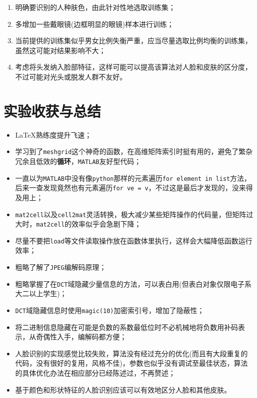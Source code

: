 \documentclass{article}
\numberwithin{figure}{section}
\numberwithin{table}{section}
\numberwithin{listing}{section}
\numberwithin{equation}{section}
\begin{document}
\begin{enumerate}
                \begin{enumerate}
                    \item 明确要识别的人种肤色，由此针对性地选取训练集；
                    \item 多增加一些戴眼镜(边框明显的眼镜)样本进行训练；
                    \item 当前提供的训练集似乎男女比例失衡严重，应当尽量选取比例均衡的训练集，虽然这可能对结果影响不大；
                    \item 考虑将头发纳入脸部特征，这样可能可以提高该算法对人脸和皮肤的区分度，不过可能对光头或脱发人群不友好。
                \end{enumerate}

        \end{enumerate}
    

    \newpage
    \section{实验收获与总结} %
    \label{sec:实验收获与总结}
    
        \begin{itemize}
            \item \LaTeX{}熟练度提升飞速；
            \item 学习到了\texttt{meshgrid}这个神奇的函数，在高维矩阵索引时挺有用的，避免了繁杂冗余且低效的\textbf{循环}，\texttt{MATLAB}友好型代码；
            \item 一直以为\texttt{MATLAB}中没有像\texttt{python}那样的元素遍历\texttt{for element in list}方法，后来一查发现竟然也有元素遍历\texttt{for ve = v}，不过这是最后才发现的，没来得及用上；
            \item \texttt{mat2cell}以及\texttt{cell2mat}灵活转换，极大减少某些矩阵操作的代码量，但矩阵过大时，\texttt{mat2cell}的效率似乎会急剧下降；
            \item 尽量不要把\texttt{load}等文件读取操作放在函数体里执行，这样会大幅降低函数运行效率；
            \item 粗略了解了\texttt{JPEG}编解码原理；
            \item 粗略掌握了在\texttt{DCT}域隐藏少量信息的方法，可以表白用(但表白对象仅限电子系大二以上学生)；
            \item \texttt{DCT}域隐藏信息时使用\texttt{magic(10)}加密索引号，增加了隐蔽性；
            \item 将二进制信息隐藏在可能是负数的系数最低位时不必机械地将负数用补码表示，从奇偶性入手，编解码都方便；
            \item 人脸识别的实现感觉比较失败，算法没有经过充分的优化(而且有大段重复的代码，没有很好的复用，风格不佳)，参数也似乎没有调试至最佳状态，算法的具体优化办法在相应部分已经陈述过，不再赘述；
            \item 基于颜色和形状特征的人脸识别应该可以有效地区分人脸和其他皮肤。
        \end{itemize}

\end{document}
